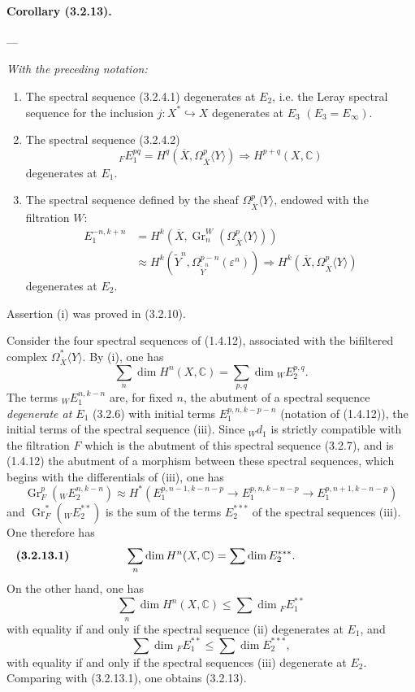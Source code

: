 \documentclass[10pt]{article}
\newcommand{\C}{\mathbb C}
\newcommand{\Gr}{\operatorname{Gr}}
\begin{document}
\paragraph{Corollary (3.2.13).} --- {\itshape With the preceding notation:
\begin{enumerate}[label=(\roman*)]
\item The spectral sequence (3.2.4.1) degenerates at $E_2$, i.e. the Leray spectral sequence for the inclusion $j:X^*\hookrightarrow X$ degenerates at $E_3$ $(E_3=E_\infty)$.
\item The spectral sequence (3.2.4.2)
\[
{}_F E_1^{pq}=H^q(\overline X,\Omega_{\overline X}^p\langle Y\rangle)
\Longrightarrow H^{p+q}(X,\C)
\]
degenerates at $E_1$.
\item The spectral sequence defined by the sheaf $\Omega_{\overline X}^{p}\langle Y\rangle$, endowed with the filtration $W$:
\[
\begin{aligned}
E_1^{-n,k+n}
&=H^k(\overline X,\Gr_n^W(\Omega_{\overline X}^{p}\langle Y\rangle))\\
&\approx H^k(\widetilde Y^n,\Omega_{\widetilde Y^n}^{p-n}(\varepsilon^n))
\Longrightarrow H^k(\overline X,\Omega_{\overline X}^{p}\langle Y\rangle)
\end{aligned}
\]
degenerates at $E_2$.
\end{enumerate}}

Assertion (i) was proved in (3.2.10).

Consider the four spectral sequences of (1.4.12), associated with the bifiltered complex $\Omega_{\overline X}^{*}\langle Y\rangle$. By (i), one has
\[
\sum_n\dim H^n(X,\C)=\sum_{p,q}\dim {}_WE_2^{p,q}.
\]
The terms ${}_WE_1^{n,k-n}$ are, for fixed $n$, the abutment of a spectral sequence \emph{degenerate at $E_1$} (3.2.6) with initial terms $E_1^{p,n,k-p-n}$ (notation of (1.4.12)), the initial terms of the spectral sequence (iii). Since ${}_Wd_1$ is strictly compatible with the filtration $F$ which is the abutment
of this spectral sequence (3.2.7), and is (1.4.12) the abutment of a morphism between these spectral sequences, which begins with the differentials of (iii), one has
\[
\Gr_F^p({}_WE_2^{n,k-n})\approx
H^*(E_1^{p,n-1,k-n-p}\to E_1^{p,n,k-n-p}\to E_1^{p,n+1,k-n-p})
\]
and $\Gr_F^*({}_WE_2^{**})$ is the sum of the terms $E_2^{***}$ of the spectral sequences (iii). One therefore has
\[
\makebox[\textwidth][s]{\textbf{(3.2.13.1)}\hfill$\displaystyle \sum_n \dim H^n(X,\C)=\sum\dim E_2^{***}.$\hfill\phantom{\textbf{(3.2.13.1)}}}
\]
On the other hand, one has
\[
\sum_n \dim H^n(X,\C)\le \sum \dim {}_F E_1^{**}
\]
with equality if and only if the spectral sequence (ii) degenerates at $E_1$, and
\[
\sum\dim {}_F E_1^{**}\le \sum\dim E_2^{***},
\]
with equality if and only if the spectral sequences (iii) degenerate at $E_2$. Comparing with (3.2.13.1), one obtains (3.2.13).
\end{document}
